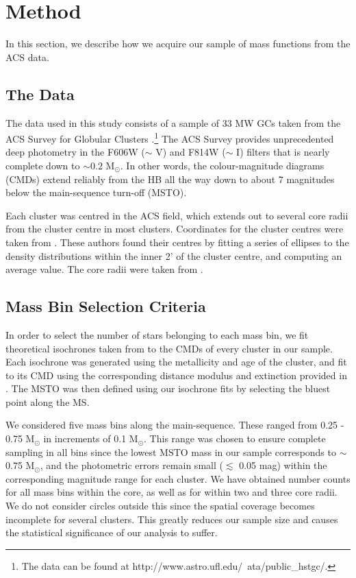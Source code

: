 \section{Method} \label{method6}

In this section, we describe how we acquire our sample of mass
functions from the ACS data.

\subsection{The Data} \label{data6}

The data used in this study consists of a sample of 33 MW GCs taken
from the ACS Survey for Globular Clusters
\citep{sarajedini07}.\footnote[1]{The
data can be found at http://www.astro.ufl.edu/~ata/public\_hstgc/.}
The ACS Survey provides unprecedented deep photometry in the F606W ($\sim$
V) and F814W ($\sim$ I) filters
that is nearly complete down to $\sim 0.2$ M$_{\odot}$.  In other
words, the colour-magnitude diagrams (CMDs) extend reliably from the
HB all the way down to about 7 magnitudes below the main-sequence
turn-off (MSTO).  

Each cluster was centred in the ACS field, which
extends out to several core radii from the cluster
centre in most clusters.  Coordinates for the cluster centres were
taken from 
\citet{goldsbury10}.  These authors found their centres by fitting
a series of ellipses to the density distributions within the inner 2'
of the cluster centre, and computing an average value.  The core
radii were taken from \citet{harris96}.

\subsection{Mass Bin Selection Criteria} \label{criteria6}

In order to select the number of stars belonging to each mass bin, 
we fit theoretical isochrones taken from \citet{dotter07}
to the CMDs of every cluster in our sample.  Each isochrone
was generated using the metallicity and age of the cluster, and fit to
its CMD using the corresponding distance modulus and extinction
provided in \citet{dotter10}.
The MSTO was then defined using our isochrone fits by selecting the
bluest point along the MS.

We considered five mass bins along the main-sequence.  These ranged
from 0.25 - 0.75 M$_{\odot}$ in increments of 0.1 M$_{\odot}$.  This
range was chosen to ensure complete sampling in all bins since the
lowest MSTO mass in our sample corresponds to $\sim$ 0.75 M$_{\odot}$,
and the photometric errors remain small ($\lesssim$ 0.05 mag) within
the corresponding 
magnitude range for each cluster.  We have obtained number counts for
all mass bins within the core, as well as for within two and three core
radii.  We do not consider circles outside this since the spatial
coverage becomes incomplete for several clusters.  This greatly
reduces our sample size and causes the statistical significance of our
analysis to suffer.

